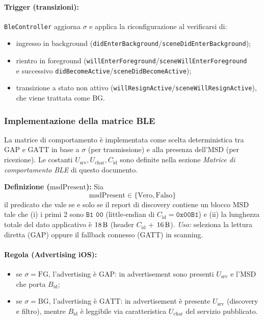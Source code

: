 \documentclass[a4paper,11pt,table,dvipsnames]{article}
\begin{document}
\paragraph{Trigger (transizioni):}
\texttt{BleController} aggiorna \(\sigma\) e applica la riconfigurazione al verificarsi di:
\begin{itemize}[nosep]
    \item ingresso in background (\texttt{didEnterBackground}/\texttt{sceneDidEnterBackground});
    \item rientro in foreground (\texttt{willEnterForeground}/\texttt{sceneWillEnterForeground} \\ e successivo \texttt{didBecomeActive}/\texttt{sceneDidBecomeActive});
    \item transizione a stato non attivo (\texttt{willResignActive}/\texttt{sceneWillResignActive}), che viene trattata come \(\mathrm{BG}\).
\end{itemize}

\subsubsection{Implementazione della matrice BLE}
La matrice di comportamento è implementata come scelta deterministica tra \(\text{GAP}\) e \(\text{GATT}\) in base a \(\sigma\) (per trasmissione) e alla presenza dell’MSD (per ricezione). Le costanti \(U_{\text{srv}}, U_{\text{char}}, C_{\text{id}}\) sono definite nella sezione \emph{Matrice di comportamento BLE} di questo documento.

\textbf{Definizione (\(\text{msdPresent}\)):}
Sia
\[
    \text{msdPresent} \in \{\text{Vero}, \text{Falso}\}
\]
il predicato che vale  se e solo se il report di discovery contiene un blocco MSD tale che (i) i primi \SI{2}{\byte} sono \(\texttt{B1 00}\) (little-endian di \(C_{\text{id}}=\texttt{0x00B1}\)) e (ii) la lunghezza totale del dato applicativo è \(\SI{18}{\byte}\) (header \(C_{\text{id}}\) + \(\SI{16}{\byte}\)).
\emph{Uso:} seleziona la lettura diretta (GAP) oppure il fallback connesso (GATT) in scanning.

\paragraph{Regola (Advertising iOS):}
\begin{itemize}[nosep]
    \item se \(\sigma=\mathrm{FG}\), l’advertising è \(\text{GAP}\): in advertisement sono presenti \(U_{\text{srv}}\) e l’MSD che porta \(B_{\text{id}}\);
    \item se \(\sigma=\mathrm{BG}\), l’advertising è \(\text{GATT}\): in advertisement è presente \(U_{\text{srv}}\) (discovery e filtro), mentre \(B_{\text{id}}\) è leggibile via caratteristica \(U_{\text{char}}\) del servizio pubblicato.
\end{itemize}
\end{document}
